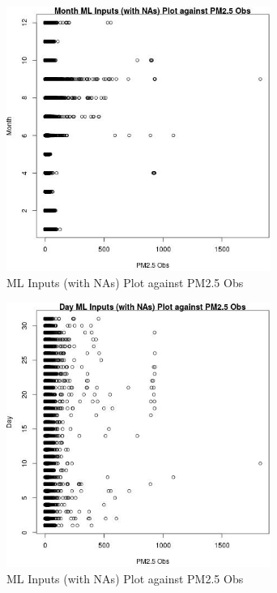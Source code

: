 \begin{figure} 
\centering  
\includegraphics[width=0.77\textwidth]{Code_Outputs/Report_ML_input_PM25_Step4_part_e_de_duplicated_aveswNAs_MonthvPM25_Obs.jpg} 
\caption{\label{fig:Report_ML_input_PM25_Step4_part_e_de_duplicated_aveswNAsMonthvPM25_Obs}ML Inputs (with NAs) Plot against PM2.5 Obs} 
\end{figure} 
 

\clearpage 

\begin{figure} 
\centering  
\includegraphics[width=0.77\textwidth]{Code_Outputs/Report_ML_input_PM25_Step4_part_e_de_duplicated_aveswNAs_DayvPM25_Obs.jpg} 
\caption{\label{fig:Report_ML_input_PM25_Step4_part_e_de_duplicated_aveswNAsDayvPM25_Obs}ML Inputs (with NAs) Plot against PM2.5 Obs} 
\end{figure} 
 

